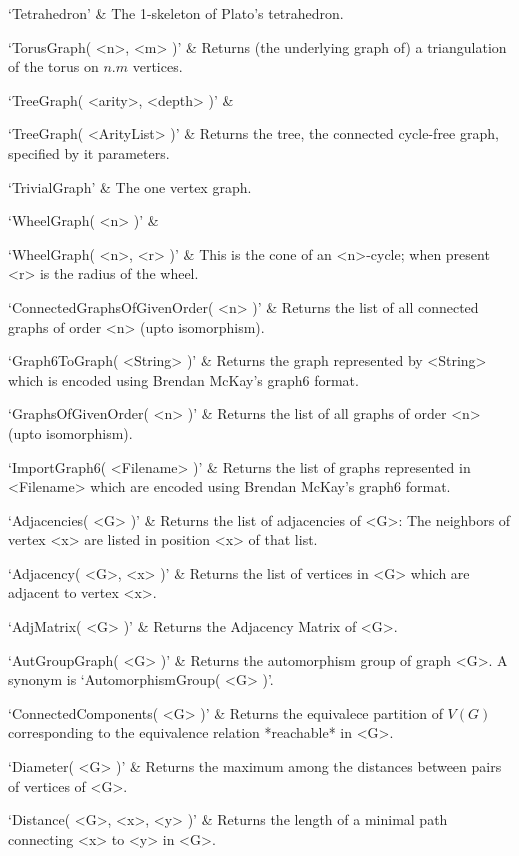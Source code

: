 `Tetrahedron' & 
The 1-skeleton of Plato's tetrahedron.

`TorusGraph( <n>, <m> )' &
Returns (the underlying graph of) a triangulation of the torus on $n.m$ vertices.

`TreeGraph( <arity>, <depth> )' &

`TreeGraph( <ArityList> )' &
Returns the tree, the connected cycle-free graph, specified by it parameters.

`TrivialGraph' & 
The one vertex graph.

`WheelGraph( <n> )' & 

`WheelGraph( <n>, <r> )' & 
This  is  the   cone  of  an  <n>-cycle; when present <r> is the radius of the wheel.
\enditems



\beginitems
`ConnectedGraphsOfGivenOrder( <n> )' &
Returns the list of all connected graphs of order <n> (upto isomorphism).

`Graph6ToGraph( <String> )' &
Returns the graph represented by <String> which is encoded using Brendan McKay's graph6 format. 

`GraphsOfGivenOrder( <n> )' &
Returns the list of all graphs of order <n> (upto isomorphism). 

`ImportGraph6( <Filename> )' &
Returns the list of graphs represented in <Filename> which are encoded using Brendan McKay's graph6 format. 
\enditems



\beginitems
`Adjacencies( <G> )' & 
Returns the list of adjacencies of <G>: The neighbors of vertex <x> are listed in position <x> of that list.

`Adjacency( <G>, <x> )' & 
Returns the list of vertices in <G> which are adjacent to vertex <x>.

`AdjMatrix( <G> )' & 
Returns the Adjacency Matrix of <G>.

`AutGroupGraph( <G> )' & 
Returns the automorphism group of graph <G>. A synonym is `AutomorphismGroup( <G> )'.

`ConnectedComponents( <G> )' & 
Returns the equivalece partition of $V(G)$ corresponding to the equivalence relation *reachable* in <G>.

`Diameter( <G> )' & 
Returns the maximum among the distances between pairs of vertices of <G>.

`Distance( <G>, <x>, <y> )' & 
Returns the length of a minimal path connecting <x> to <y> in <G>.

